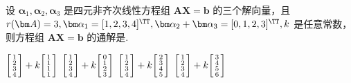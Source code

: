	\begin{titwo}
		设 $\bm \alpha_{1},\bm \alpha_{2},\bm \alpha_{3}$ 是四元非齐次线性方程组 $\bm A \bm X = \bm b$ 的三个解向量，且 $r(\bm A) = 3,\bm \alpha_{1}  = [1,2,3,4]^{\TT},\bm \alpha_{2} + \bm \alpha_{3} = [0,1,2,3]^{\TT},k$ 是任意常数，则方程组 $\bm A \bm X = \bm b$ 的通解是\kuo.

		\twoch%
		{$\begin{bsmallmatrix}
			1 \\
			2 \\
			3 \\
			4
		\end{bsmallmatrix} + k \begin{bsmallmatrix}
			1 \\
			1 \\
			1 \\
			1
		\end{bsmallmatrix}$}
		{$\begin{bsmallmatrix}
			1 \\
			2 \\
			3 \\
			4
		\end{bsmallmatrix} + k \begin{bsmallmatrix}
			0 \\
			1 \\
			2 \\
			3
		\end{bsmallmatrix}$}%
		{$\begin{bsmallmatrix}
			1 \\
			2 \\
			3 \\
			4
		\end{bsmallmatrix} + k \begin{bsmallmatrix}
			2 \\
			3 \\
			4 \\
			5
		\end{bsmallmatrix}$}%
		{$\begin{bsmallmatrix}
			1 \\
			2 \\
			3 \\
			4
		\end{bsmallmatrix} + k \begin{bsmallmatrix}
			3 \\
			4 \\
			5 \\
			6
		\end{bsmallmatrix}$}
	\end{titwo}

